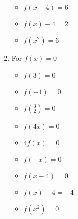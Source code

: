 \documentclass{ximera}
\begin{document}
\begin{enumerate}
\begin{itemize}

\item  $f(x-4) = 6$ 

\item $f(x) - 4 = 2$
     
\item  $f\left(x^2\right) = 6$

\end{itemize}




\item For $f(x) = 0$ 


\begin{itemize}
\item $f(3) = 0$
\item $f(-1) =0$
\item $f\left(\frac{3}{2} \right) = 0$
\end{itemize}


\begin{itemize}
\item  $f(4x) = 0$
\item $4f(x) = 0$
\item $f(-x) = 0$
\end{itemize}


\begin{itemize}

\item  $f(x-4) = 0$ 

\item $f(x) - 4 = -4$
     
\item  $f\left(x^2\right) = 0$

\end{itemize}


\end{enumerate}
\end{document}
